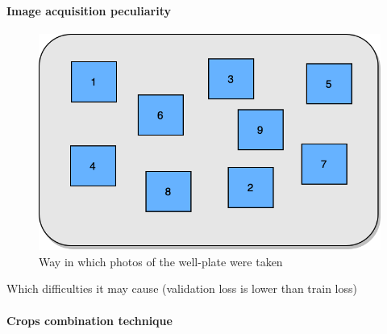         
\paragraph{Image acquisition peculiarity} 
    \begin{figure}[htb]
        \begin{center}
            \includegraphics[width=0.5\linewidth]{bilder/dic-random.png}
            \caption{Way in which photos of the well-plate were taken}\label{fig:random-dic}
        \end{center}
    \end{figure}    
    Which difficulties it may cause (validation loss is lower than train loss)
\paragraph{Crops combination technique}
    